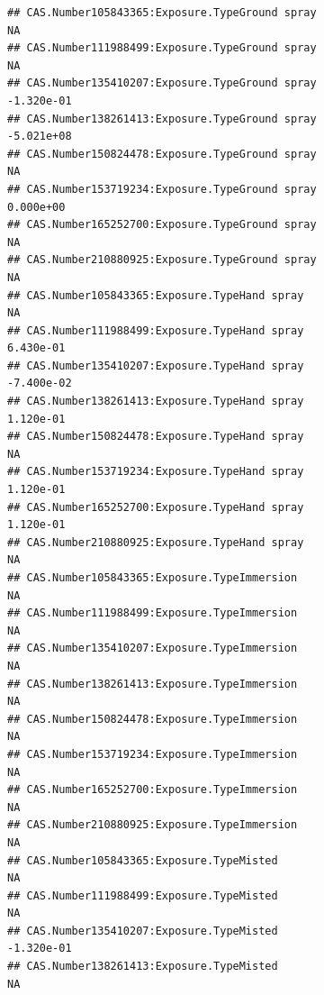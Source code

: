 \documentclass[
  12pt,
]{article}
\begin{document}
\begin{verbatim}
## CAS.Number105843365:Exposure.TypeGround spray                                           NA
## CAS.Number111988499:Exposure.TypeGround spray                                           NA
## CAS.Number135410207:Exposure.TypeGround spray                                   -1.320e-01
## CAS.Number138261413:Exposure.TypeGround spray                                   -5.021e+08
## CAS.Number150824478:Exposure.TypeGround spray                                           NA
## CAS.Number153719234:Exposure.TypeGround spray                                    0.000e+00
## CAS.Number165252700:Exposure.TypeGround spray                                           NA
## CAS.Number210880925:Exposure.TypeGround spray                                           NA
## CAS.Number105843365:Exposure.TypeHand spray                                             NA
## CAS.Number111988499:Exposure.TypeHand spray                                      6.430e-01
## CAS.Number135410207:Exposure.TypeHand spray                                     -7.400e-02
## CAS.Number138261413:Exposure.TypeHand spray                                      1.120e-01
## CAS.Number150824478:Exposure.TypeHand spray                                             NA
## CAS.Number153719234:Exposure.TypeHand spray                                      1.120e-01
## CAS.Number165252700:Exposure.TypeHand spray                                      1.120e-01
## CAS.Number210880925:Exposure.TypeHand spray                                             NA
## CAS.Number105843365:Exposure.TypeImmersion                                              NA
## CAS.Number111988499:Exposure.TypeImmersion                                              NA
## CAS.Number135410207:Exposure.TypeImmersion                                              NA
## CAS.Number138261413:Exposure.TypeImmersion                                              NA
## CAS.Number150824478:Exposure.TypeImmersion                                              NA
## CAS.Number153719234:Exposure.TypeImmersion                                              NA
## CAS.Number165252700:Exposure.TypeImmersion                                              NA
## CAS.Number210880925:Exposure.TypeImmersion                                              NA
## CAS.Number105843365:Exposure.TypeMisted                                                 NA
## CAS.Number111988499:Exposure.TypeMisted                                                 NA
## CAS.Number135410207:Exposure.TypeMisted                                         -1.320e-01
## CAS.Number138261413:Exposure.TypeMisted                                                 NA

\end{verbatim}
\end{document}
